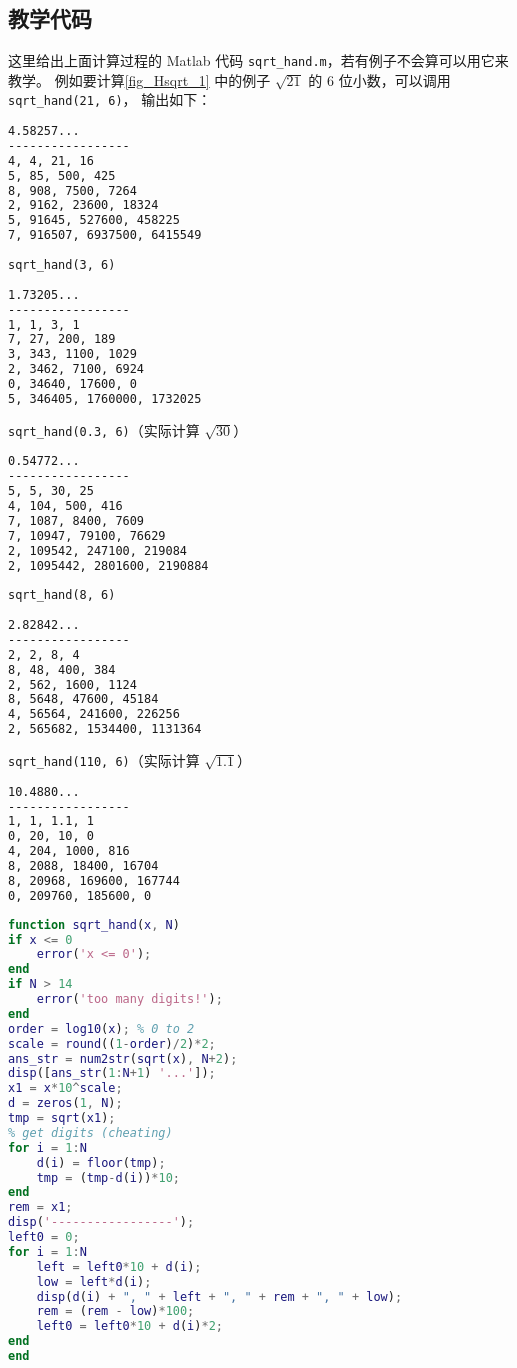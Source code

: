 \subsection{教学代码}
这里给出上面计算过程的 Matlab 代码 \verb`sqrt_hand.m`，若有例子不会算可以用它来教学。 例如要计算\autoref{fig_Hsqrt_1} 中的例子 $\sqrt{21}$ 的 6 位小数，可以调用 \verb|sqrt_hand(21, 6)|， 输出如下：
\begin{lstlisting}[language=bash]
4.58257...
-----------------
4, 4, 21, 16
5, 85, 500, 425
8, 908, 7500, 7264
2, 9162, 23600, 18324
5, 91645, 527600, 458225
7, 916507, 6937500, 6415549
\end{lstlisting}
\verb|sqrt_hand(3, 6)|
\begin{lstlisting}[language=bash]
1.73205...
-----------------
1, 1, 3, 1
7, 27, 200, 189
3, 343, 1100, 1029
2, 3462, 7100, 6924
0, 34640, 17600, 0
5, 346405, 1760000, 1732025
\end{lstlisting}
\verb|sqrt_hand(0.3, 6)|（实际计算 $\sqrt{30}$）
\begin{lstlisting}[language=bash]
0.54772...
-----------------
5, 5, 30, 25
4, 104, 500, 416
7, 1087, 8400, 7609
7, 10947, 79100, 76629
2, 109542, 247100, 219084
2, 1095442, 2801600, 2190884
\end{lstlisting}
\verb`sqrt_hand(8, 6)`
\begin{lstlisting}[language=bash]
2.82842...
-----------------
2, 2, 8, 4
8, 48, 400, 384
2, 562, 1600, 1124
8, 5648, 47600, 45184
4, 56564, 241600, 226256
2, 565682, 1534400, 1131364
\end{lstlisting}
\verb|sqrt_hand(110, 6)|（实际计算 $\sqrt{1.1}$）
\begin{lstlisting}[language=bash]
10.4880...
-----------------
1, 1, 1.1, 1
0, 20, 10, 0
4, 204, 1000, 816
8, 2088, 18400, 16704
8, 20968, 169600, 167744
0, 209760, 185600, 0
\end{lstlisting}

\begin{lstlisting}[language=matlab,caption=sqrt\_hand.m]
function sqrt_hand(x, N)
if x <= 0
    error('x <= 0');
end
if N > 14
    error('too many digits!');
end
order = log10(x); % 0 to 2
scale = round((1-order)/2)*2;
ans_str = num2str(sqrt(x), N+2);
disp([ans_str(1:N+1) '...']);
x1 = x*10^scale;
d = zeros(1, N);
tmp = sqrt(x1);
% get digits (cheating)
for i = 1:N
    d(i) = floor(tmp);
    tmp = (tmp-d(i))*10;
end
rem = x1;
disp('-----------------');
left0 = 0;
for i = 1:N
    left = left0*10 + d(i);
    low = left*d(i);
    disp(d(i) + ", " + left + ", " + rem + ", " + low);
    rem = (rem - low)*100;
    left0 = left0*10 + d(i)*2;
end
end
\end{lstlisting}
